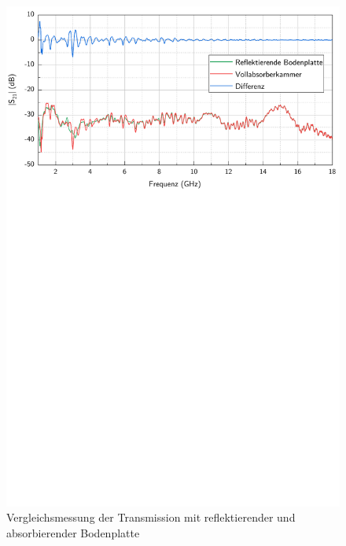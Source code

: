 \begin{figure}[ht]
    \centering
    \includegraphics[page=1, width=.99\textwidth, trim = 0cm 15.6cm 0cm 0cm]{Abbildungen/Kapitel4/Messergebnisse/Vergleich Absorber unter Reflektor.pdf}
    \caption{Vergleichsmessung der Transmission mit reflektierender und absorbierender Bodenplatte}
    \label{fig:4_Vergleich_Absorber_unter_Reflektor}
\end{figure}



